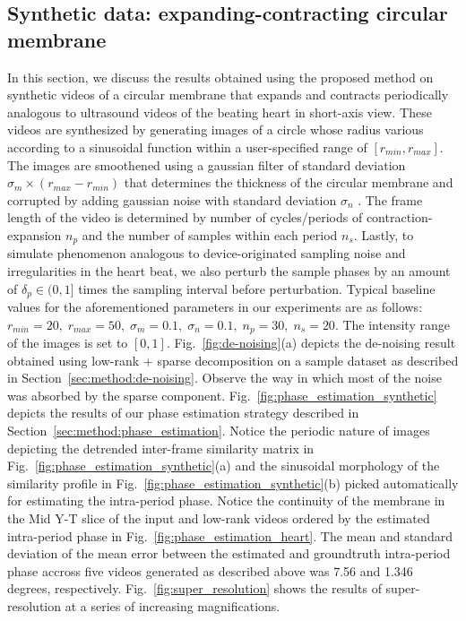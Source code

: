 \documentclass[runningheads,a4paper]{llncs}
\begin{document}
\subsection{Synthetic data: expanding-contracting circular membrane}
\label{sec:results:vibrating_circle}
In this section, we discuss the results obtained using the proposed method on synthetic videos of a circular membrane that expands and contracts periodically analogous to ultrasound videos of the beating heart in short-axis view. These videos are synthesized by  generating images of a circle whose radius various according to a sinusoidal function within a user-specified range of $[r_{min}, r_{max}]$. The images are smoothened using a gaussian filter of standard deviation $\sigma_m \times (r_{max} - r_{min})$ that determines the thickness of the circular membrane and corrupted by adding gaussian noise with standard deviation $\sigma_n$ . The frame length of the video is determined by number of cycles/periods of contraction-expansion $n_p$ and the number of samples within each period $n_s$. Lastly, to simulate phenomenon analogous to device-originated sampling noise and irregularities in the heart beat, we also perturb the sample phases by an amount of $\delta_p \in (0, 1]$ times the sampling interval before perturbation. Typical baseline values for the aforementioned parameters in our experiments are as follows: $r_{min} = 20, \; r_{max} = 50, \; \sigma_m = 0.1, \; \sigma_n = 0.1, \; n_p = 30, \; n_s = 20$. The intensity range of the images is set to $[0, 1]$. Fig.~\ref{fig:de-noising}(a) depicts the de-noising result obtained using low-rank $+$ sparse decomposition on a sample dataset as described in Section~\ref{sec:method:de-noising}. Observe the way in which most of the noise was absorbed by the sparse component. Fig.~\ref{fig:phase_estimation_synthetic} depicts the results of our phase estimation strategy described in Section~\ref{sec:method:phase_estimation}. Notice the periodic nature of images depicting the detrended inter-frame similarity matrix in Fig.~\ref{fig:phase_estimation_synthetic}(a) and the sinusoidal morphology of the similarity profile in Fig.~\ref{fig:phase_estimation_synthetic}(b) picked automatically for estimating the intra-period phase. Notice the continuity of the membrane in the Mid Y-T slice of the input and low-rank videos ordered by the estimated intra-period phase in Fig.~\ref{fig:phase_estimation_heart}. The mean and standard deviation of the mean error between the estimated and groundtruth intra-period phase accross five videos generated as described above was 7.56 and 1.346 degrees, respectively. Fig.~\ref{fig:super_resolution} shows the results of super-resolution at a series of increasing magnifications.
\vspace{-0.1cm}
\end{document}
